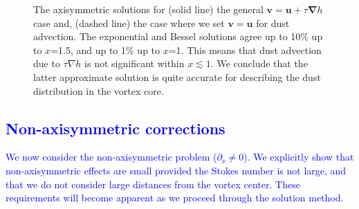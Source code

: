 \documentclass[apj]{emulateapj}
\renewcommand{\v}[1]{{\boldsymbol{#1}}} %
\def\blue#1{\textcolor{blue}{#1}}
\newcommand{\del}{\v{\nabla}}
\newcommand{\grad}{\del}
\begin{document}
\begin{figure}
  \begin{center}
  \end{center}
\caption[]{The axisymmetric solutions for (solid line) the general 
$\v{v}=\v{u}+\tau\grad{h}$ case and, (dashed line) the case where
  we set $\v{v}=\v{u}$ for dust advection. 
The exponential and Bessel solutions agree up to 10\% up to $x$=1.5, and up 
to 1\% up to $x$=1. This means that dust advection due to $\tau\nabla{h}$
is not significant within $x\lesssim1$. We conclude that the latter
approximate solution is quite accurate for describing the dust
distribution in the vortex core.} 
 \label{fig:bessel-gaussian}
\end{figure}

\blue{
\section{Non-axisymmetric corrections}
\label{sect:nonaxisymmetric} 
}
\blue{
We now consider the non-axisymmetric problem ($\partial_\nu\neq0$). 
We explicitly show that non-axisymmetric effects are small provided the Stokes number is not 
large, and that we do not consider large distances from the vortex center. These requirements will become 
apparent as we proceed through the solution method. 
}
\end{document}
